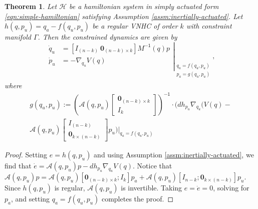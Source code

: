 \documentclass[journal,twoside,web]{ieeecolor}
\newtheorem{thm}{Theorem}%
\newcommand*{\inv}{^\mathsf{-1}}
\newcommand*{\Minv}{M^\mathsf{-1}}
\newcommand*{\Id}[1]{I_{#1}}
\newcommand*{\Zmat}[1]{\bm{0}_{#1}}
\begin{document}
\begin{thm}\label{thm:zero-dynamics}
    Let \(\mathcal{H}\) be a hamiltonian system in simply actuated form
    \eqref{eqn:simple-hamiltonian} satisfying
    Assumption \ref{assm:inertially-actuated}. 
    Let \(h(q,p_u) = q_a - f(q_u,p_u)\) be a regular VNHC of order \(k\) with
    constraint manifold \(\Gamma\). 
    Then the constrained dynamics are given by
    \begin{equation}\label{eqn:qpu-dynamics}
        \left.\begin{aligned}
                \dot{q}_u &= 
                \left[\Id{(n-k)} ~ \Zmat{(n-k) \times k}\right]
                \Minv(q)p \\
            \dot{p}_u &= -\nabla_{q_u}V(q) \\
            \end{aligned}{}\right|_{\begin{array}{c}
                q_a = f(q_u,p_u) \\ 
                p_a = g(q_u,p_u) \\
            \end{array}}
            ,
    \end{equation}
    where
    \begin{multline}\label{eqn:g-qpu}
        g(q_u,p_u) := \left( \mathcal{A}(q,p_u)
        \begin{bmatrix} \Zmat{(n-k)\times k} \\ \Id{k} \end{bmatrix}\right)\inv 
        \cdot
        \Big(dh_{p_u}\nabla_{q_u}(V(q) -
        \\
        \mathcal{A}(q,p_u)
        \begin{bmatrix} \Id{(n-k)} \\ \Zmat{k \times (n-k)} \end{bmatrix} p_u
        \left.\Big)\right|_{q_a = f(q_u,p_u)}
    \end{multline}

\end{thm}
\begin{proof}
    Setting \(e = h(q,p_u)\) and using Assumption
    \ref{assm:inertially-actuated}, we find that
    \(\dot{e} = \mathcal{A}(q,p_u)p - dh_{p_u}\nabla_{q_u}V(q)\).
    Notice that
    \(\mathcal{A}(q,p_u)p = \mathcal{A}(q,p_u)[\Zmat{(n-k)\times k}; \Id{k}]p_a
    + \mathcal{A}(q,p_u)[\Id{n-k};\Zmat{k \times (n-k)}] p_u\).
    Since \(h(q,p_u)\) is regular, \(\mathcal{A}(q,p_u)\) is invertible.
    Taking \(e = \dot{e} = 0\), solving for \(p_a\), and setting 
    \(q_a = f(q_u,p_u)\) completes the proof.
\end{proof}
\end{document}
